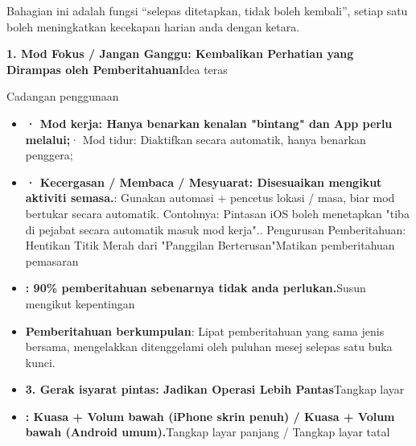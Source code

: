 
Bahagian ini adalah fungsi “selepas ditetapkan, tidak boleh kembali”, setiap satu boleh meningkatkan kecekapan harian anda dengan ketara.

\textbf{1. Mod Fokus / Jangan Ganggu: Kembalikan Perhatian yang Dirampas oleh Pemberitahuan}Idea teras


Cadangan penggunaan


\begin{itemize}
  \item \textbf{· Mod kerja: Hanya benarkan kenalan "bintang" dan App perlu melalui;}· Mod tidur: Diaktifkan secara automatik, hanya benarkan penggera;
  \item \textbf{· Kecergasan / Membaca / Mesyuarat: Disesuaikan mengikut aktiviti semasa.}\newline : Gunakan automasi + pencetus lokasi / masa, biar mod bertukar secara automatik. Contohnya: Pintasan iOS boleh menetapkan "tiba di pejabat secara automatik masuk mod kerja".. Pengurusan Pemberitahuan: Hentikan Titik Merah dari "Panggilan Berterusan"\newline Matikan pemberitahuan pemasaran
  \item \textbf{: 90\% pemberitahuan sebenarnya tidak anda perlukan.}Susun mengikut kepentingan
\end{itemize}


\begin{itemize}
  \item \textbf{Pemberitahuan berkumpulan}: Lipat pemberitahuan yang sama jenis bersama, mengelakkan ditenggelami oleh puluhan mesej selepas satu buka kunci.
  \item \textbf{3. Gerak isyarat pintas: Jadikan Operasi Lebih Pantas}Tangkap layar
  \item \textbf{: Kuasa + Volum bawah (iPhone skrin penuh) / Kuasa + Volum bawah (Android umum).}Tangkap layar panjang / Tangkap layar tatal
\end{itemize}

